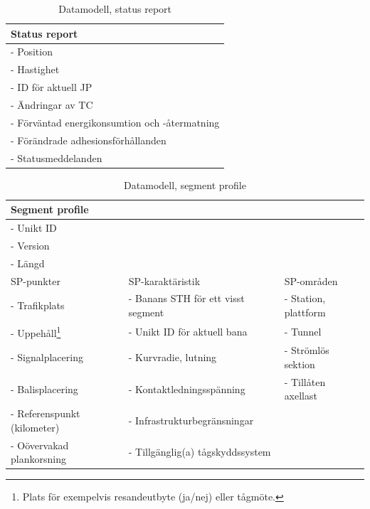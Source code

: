 \begin{table}
    \centering
    \begin{tabular}{|l|}
        \hline
        \textbf{Status report} \\
        \hline
        - Position \\
        - Hastighet \\
        - ID för aktuell JP \\
        - Ändringar av TC \\
        - Förväntad energikonsumtion och -återmatning \\
        - Förändrade adhesionsförhållanden \\
        - Statusmeddelanden \\
        \hline
    \end{tabular}
    \caption{Datamodell, status report}
    \label{tab:sr}
\end{table}
\begin{table}
    \centering
    \begin{tabular}{|l|l|l|}
        \hline
        \textbf{Segment profile} & & \\
        \hline
        - Unikt ID & & \\
        - Version & & \\
        - Längd & & \\
        \hline
        SP-punkter & SP-karaktäristik & SP-områden \\
        \hline
        - Trafikplats & - Banans STH för ett visst segment & - Station, plattform \\
        - Uppehåll\footnote{Plats för exempelvis resandeutbyte (ja/nej) eller tågmöte.} & - Unikt ID för aktuell bana & - Tunnel \\
        - Signalplacering & - Kurvradie, lutning & - Strömlös sektion \\
        - Balisplacering & - Kontaktledningsspänning & - Tillåten axellast \\
        - Referenspunkt (kilometer) & - Infrastrukturbegränsningar &  \\
        - Oövervakad plankorsning & - Tillgänglig(a) tågskyddssystem & \\
        \hline
    \end{tabular}
    \caption{Datamodell, segment profile}
    \label{tab:sp}
\end{table}
